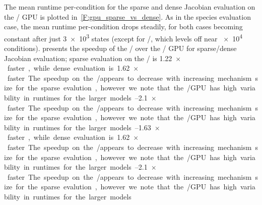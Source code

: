 \documentclass[12pt,number,sort&compress,preprint]{elsarticle}
\begin{document}
The mean runtime per-condition for the sparse and dense Jacobian evaluation on the \gpunew/ GPU is plotted in~\cref{F:gpu_sparse_vs_dense}.
As in the species evaluation case, the mean runtime per-condition drops steadily, for both cases becoming constant after just \num{3e3} states (except for \slash{}, which levels off near \num{e4} conditions).
 presents the speedup of the \gpunew/ over the \gpuold/ GPU for sparse\slash dense Jacobian evaluation; sparse evaluation on the \gpunew/ is \SIrange{1.22}{1.63}{$\times$} faster, while dense evaluation is \SIrange{1.62}{2.1}{$\times$} faster.
The speedup on the \gpunew/ appears to decrease with increasing mechanism size for the sparse evalution, however we note that the \gpuold/ GPU has high variability in runtimes for the larger models.
\end{document}
